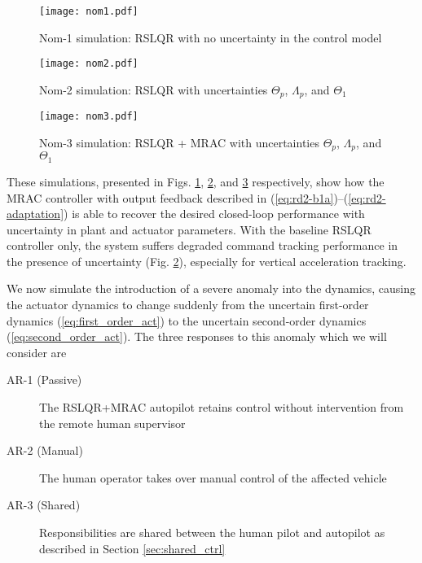 \begin{figure}[htbp]
	\centering
	\texttt{[image: nom1.pdf]}
	\caption{Nom-1 simulation: RSLQR with no uncertainty in the control model}
	\label{fig:nom1}
\end{figure}

\begin{figure}[htbp]
	\centering
	\texttt{[image: nom2.pdf]}
	\caption{Nom-2 simulation: RSLQR with uncertainties $\Theta_p$, $\Lambda_p$, and $\Theta_1$}
	\label{fig:nom2}
\end{figure}

\begin{figure}[htbp]
	\centering
	\texttt{[image: nom3.pdf]}
	\caption{Nom-3 simulation: RSLQR + MRAC with uncertainties $\Theta_p$, $\Lambda_p$, and $\Theta_1$}
	\label{fig:nom3}
\end{figure}

These simulations, presented in Figs. \ref{fig:nom1}, \ref{fig:nom2}, and \ref{fig:nom3} respectively, show how the MRAC controller with output feedback described in (\ref{eq:rd2-b1a})--(\ref{eq:rd2-adaptation}) is able to recover the desired closed-loop performance with uncertainty in plant and actuator parameters. With the baseline RSLQR controller only, the system suffers degraded command tracking performance in the presence of uncertainty (Fig. \ref{fig:nom2}), especially for vertical acceleration tracking.

We now simulate the introduction of a severe anomaly into the dynamics, causing the actuator dynamics to change suddenly from the uncertain first-order dynamics (\ref{eq:first_order_act}) to the uncertain second-order dynamics (\ref{eq:second_order_act}). The three responses to this anomaly which we will consider are
\begin{description}
	\item[AR-1 (Passive)] The RSLQR+MRAC autopilot retains control without intervention from the remote human supervisor
	\item[AR-2 (Manual)] The human operator takes over manual control of the affected vehicle
	\item[AR-3 (Shared)] Responsibilities are shared between the human pilot and autopilot as described in Section \ref{sec:shared_ctrl}
\end{description}

